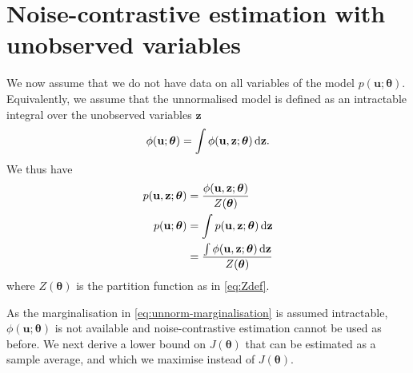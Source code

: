 \documentclass[11pt, oneside]{article}
\newcommand{\thetab}{{\boldsymbol{\theta}}}
\newcommand{\pnorm}{p}
\newcommand{\pnn}{\phi}
\renewcommand{\u}{{\mathbf u}}
\newcommand{\z}{{\mathbf z}}
\begin{document}
\section{Noise-contrastive estimation with unobserved variables}
We now assume that we do not have data on all variables of the model
$\pnorm(\u;\thetab)$. Equivalently, we assume that the unnormalised
model is defined as an intractable integral over the unobserved variables $\z$
\begin{align}
  \pnn(\u;\thetab) = \int \pnn(\u, \z;\thetab) \dif \z. \label{eq:unnorm-marginalisation}
\end{align}
We thus have
\begin{align}
  \pnorm(\u,\z;\thetab) &= \frac{\pnn(\u, \z;\thetab)}{Z(\thetab)}\\
  \pnorm(\u; \thetab) &= \int \pnorm(\u, \z;\thetab) \dif \z\\
&=  \frac{\int \pnn(\u, \z;\thetab) \dif \z}{Z(\thetab)}
\end{align}
where $Z(\thetab)$ is the partition function as in \eqref{eq:Zdef}.

As the marginalisation in \eqref{eq:unnorm-marginalisation} is assumed
intractable, $\pnn(\u;\thetab)$ is not available and noise-contrastive
estimation cannot be used as before. We next derive a lower bound on
$J(\thetab)$ that can be estimated as a sample average, and which we maximise instead of $J(\thetab)$.
\end{document}
